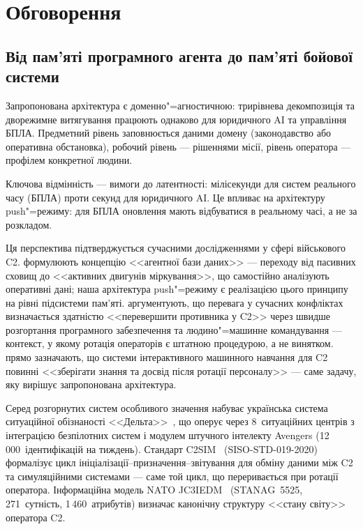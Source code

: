 \documentclass[11pt]{article}
\begin{document}
\section{Обговорення}
\label{sec:discussion}

\subsection{Від пам'яті програмного агента до пам'яті бойової системи}

Запропонована архітектура є доменно"=агностичною: трирівнева декомпозиція та дворежимне витягування працюють однаково для юридичного AI та управління БПЛА.
Предметний рівень заповнюється даними домену (законодавство або оперативна обстановка), робочий рівень --- рішеннями місії, рівень оператора --- профілем конкретної людини.

Ключова відмінність --- вимоги до латентності: мілісекунди для систем реального часу (БПЛА) проти секунд для юридичного AI.
Це впливає на архітектуру push"=режиму: для БПЛА оновлення мають відбуватися в реальному часі, а не за розкладом.

Ця перспектива підтверджується сучасними дослідженнями у сфері військового C2.
\citet{ndu2025agentic} формулюють концепцію <<агентної бази даних>> --- переходу від пасивних сховищ до <<активних двигунів міркування>>, що самостійно аналізують оперативні дані; наша архітектура push"=режиму є реалізацією цього принципу на рівні підсистеми пам'яті.
\citet{scsp2024reimagining} аргументують, що перевага у сучасних конфліктах визначається здатністю <<перевершити противника у C2>> через швидше розгортання програмного забезпечення та людино"=машинне командування --- контекст, у якому ротація операторів є штатною процедурою, а не винятком.
\citet{perry2024scalable} прямо зазначають, що системи інтерактивного машинного навчання для C2 повинні <<зберігати знання та досвід після ротації персоналу>> --- саме задачу, яку вирішує запропонована архітектура.

Серед розгорнутих систем особливого значення набуває українська система ситуаційної обізнаності <<Дельта>>~\citep{bondar2024delta}, що оперує через 8~ситуаційних центрів з інтеграцією безпілотних систем і модулем штучного інтелекту Avengers (12\,000~ідентифікацій на тиждень).
Стандарт C2SIM~\citep{openc2sim2020} (SISO-STD-019-2020) формалізує цикл ініціалізації--призначення--звітування для обміну даними між C2 та симуляційними системами --- саме той цикл, що переривається при ротації оператора.
Інформаційна модель NATO JC3IEDM~\citep{jc3iedm2025} (STANAG~5525, 271~сутність, 1\,460~атрибутів) визначає канонічну структуру <<стану світу>> оператора C2.
\end{document}
